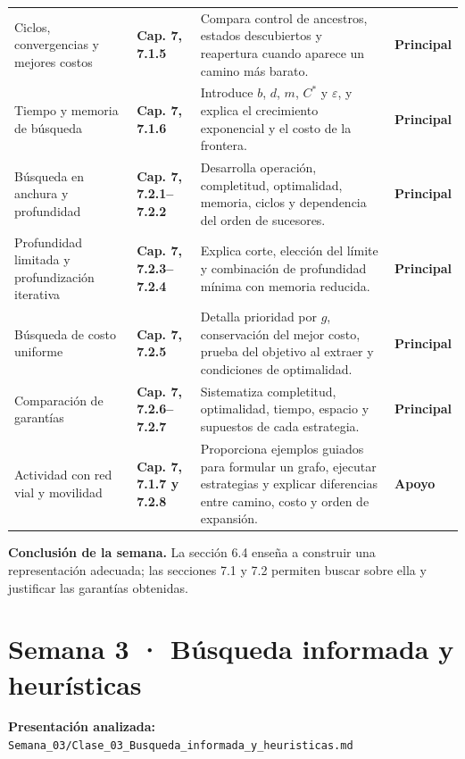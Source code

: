 \documentclass[10pt,a4paper]{article}
\newcommand{\capitulo}[1]{\textbf{\color{UAPTeal}#1}}
\newcommand{\principal}{\textbf{Principal}}
\newcommand{\apoyo}{\textbf{Apoyo}}
\begin{document}
\begin{longtable}{P{3.35cm}P{4.05cm}P{6.25cm}P{2.15cm}}
Ciclos, convergencias y mejores costos & \capitulo{Cap. 7, 7.1.5} & Compara control de ancestros, estados descubiertos y reapertura cuando aparece un camino más barato. & \principal \\
Tiempo y memoria de búsqueda & \capitulo{Cap. 7, 7.1.6} & Introduce $b$, $d$, $m$, $C^*$ y $\varepsilon$, y explica el crecimiento exponencial y el costo de la frontera. & \principal \\
Búsqueda en anchura y profundidad & \capitulo{Cap. 7, 7.2.1--7.2.2} & Desarrolla operación, completitud, optimalidad, memoria, ciclos y dependencia del orden de sucesores. & \principal \\
Profundidad limitada y profundización iterativa & \capitulo{Cap. 7, 7.2.3--7.2.4} & Explica corte, elección del límite y combinación de profundidad mínima con memoria reducida. & \principal \\
Búsqueda de costo uniforme & \capitulo{Cap. 7, 7.2.5} & Detalla prioridad por $g$, conservación del mejor costo, prueba del objetivo al extraer y condiciones de optimalidad. & \principal \\
Comparación de garantías & \capitulo{Cap. 7, 7.2.6--7.2.7} & Sistematiza completitud, optimalidad, tiempo, espacio y supuestos de cada estrategia. & \principal \\
Actividad con red vial y movilidad & \capitulo{Cap. 7, 7.1.7 y 7.2.8} & Proporciona ejemplos guiados para formular un grafo, ejecutar estrategias y explicar diferencias entre camino, costo y orden de expansión. & \apoyo \\
\bottomrule
\end{longtable}

\textbf{Conclusión de la semana.} La sección 6.4 enseña a construir una representación adecuada; las secciones 7.1 y 7.2 permiten buscar sobre ella y justificar las garantías obtenidas.

\section*{Semana 3 · Búsqueda informada y heurísticas}

\textbf{Presentación analizada:} \texttt{Semana\_03/Clase\_03\_Busqueda\_informada\_y\_heuristicas.md}
\end{document}
